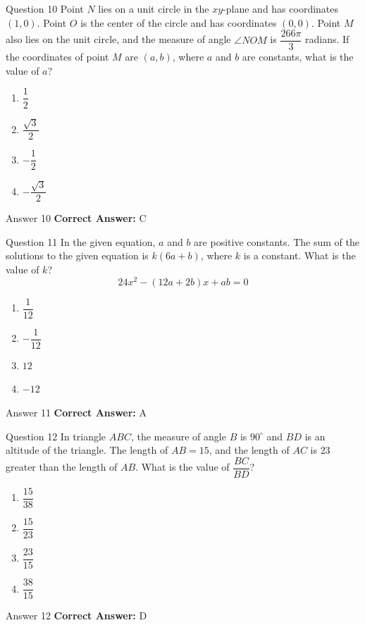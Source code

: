 \documentclass{beamer}
\begin{document}
\begin{frame}{Question 10}
\small
Point \(N\) lies on a unit circle in the \(xy\)-plane and has coordinates \((1, 0)\). Point \(O\) is the center of the circle and has coordinates \((0, 0)\). Point \(M\) also lies on the unit circle, and the measure of angle \(\angle NOM\) is \(\dfrac{266\pi}{3}\) radians. If the coordinates of point \(M\) are \((a, b)\), where \(a\) and \(b\) are constants, what is the value of \(a\)?
\vspace{0.35cm}
\begin{enumerate}
    \item[A.] \(\dfrac{1}{2}\)
    \item[B.] \(\dfrac{\sqrt{3}}{2}\)
    \item[C.] \(-\dfrac{1}{2}\)
    \item[D.] \(-\dfrac{\sqrt{3}}{2}\)
\end{enumerate}
\end{frame}
\begin{frame}{Answer 10}
\small
\textbf{Correct Answer:} C
\end{frame}

\begin{frame}{Question 11}
\small
In the given equation, \(a\) and \(b\) are positive constants. The sum of the solutions to the given equation is \(k(6a + b)\), where \(k\) is a constant. What is the value of \(k\)?
\[
24x^{2} - (12a + 2b)x + ab = 0
\]
\vspace{0.35cm}
\begin{enumerate}
    \item[A.] \(\dfrac{1}{12}\)
    \item[B.] \(-\dfrac{1}{12}\)
    \item[C.] \(12\)
    \item[D.] \(-12\)
\end{enumerate}
\end{frame}
\begin{frame}{Answer 11}
\small
\textbf{Correct Answer:} A
\end{frame}

\begin{frame}{Question 12}
\small
In triangle \(ABC\), the measure of angle \(B\) is \(90^\circ\) and \(BD\) is an altitude of the triangle. The length of \(AB = 15\), and the length of \(AC\) is \(23\) greater than the length of \(AB\). What is the value of \(\dfrac{BC}{BD}\)?
\vspace{0.35cm}
\begin{enumerate}
    \item[A.] \(\dfrac{15}{38}\)
    \item[B.] \(\dfrac{15}{23}\)
    \item[C.] \(\dfrac{23}{15}\)
    \item[D.] \(\dfrac{38}{15}\)
\end{enumerate}
\end{frame}
\begin{frame}{Answer 12}
\small
\textbf{Correct Answer:} D
\end{frame}
\end{document}
